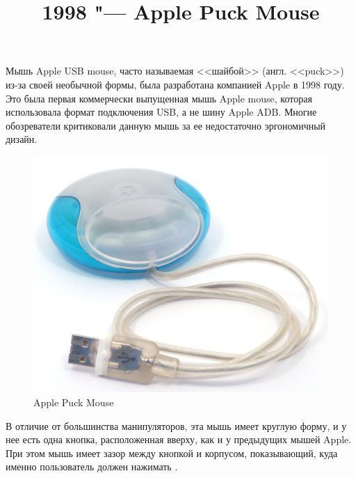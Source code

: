 \documentclass[11pt, a4paper]{article}
\begin{document}
\title{1998 "--- Apple Puck Mouse}
\date{}
\maketitle
Мышь Apple USB mouse, часто называемая <<шайбой>> (англ. <<puck>>)  из-за своей необычной формы, была разработана компанией Apple в 1998 году. Это была первая коммерчески выпущенная мышь Apple mouse, которая использовала формат подключения USB, а не шину Apple ADB. Многие обозреватели критиковали данную мышь за ее недостаточно эргономичный дизайн.

\begin{figure}[h]
    \centering
    \includegraphics[scale=0.8]{1998_apple_puck/apple60.jpg}
    \caption{Apple Puck Mouse}
    \label{fig:pic}
\end{figure}

В отличие от большинства манипуляторов, эта мышь имеет круглую форму, и у нее есть одна кнопка, расположенная вверху, как и у предыдущих мышей Apple. При этом мышь имеет зазор между кнопкой и корпусом, показывающий, куда именно пользователь должен нажимать \cite{Apple}.
\end{document}
